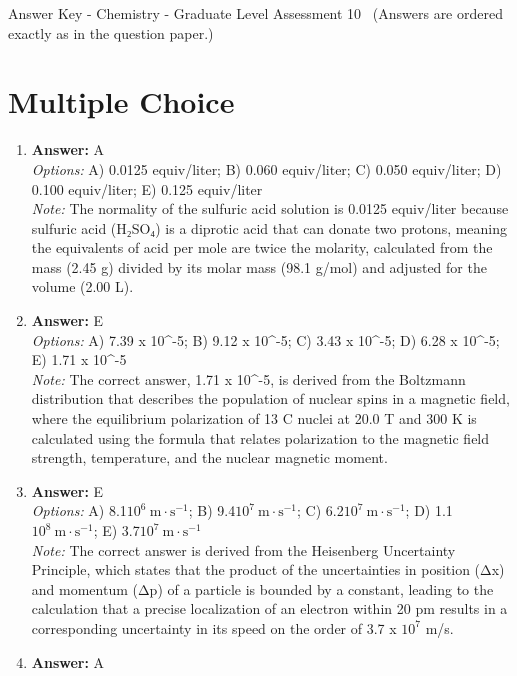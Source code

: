 \documentclass[12pt]{article}
\begin{document}
\begin{center}
Answer Key - Chemistry - Graduate Level Assessment 10 \
\small (Answers are ordered exactly as in the question paper.)
\end{center}

\section*{Multiple Choice}
\begin{enumerate}[label=\arabic*.]
\item \textbf{Answer:} A
\\ \textit{Options:} A) 0.0125 equiv/liter; B) 0.060 equiv/liter; C) 0.050 equiv/liter; D) 0.100 equiv/liter; E) 0.125 equiv/liter
\\ \textit{Note:} The normality of the sulfuric acid solution is 0.0125 equiv/liter because sulfuric acid (H₂SO₄) is a diprotic acid that can donate two protons, meaning the equivalents of acid per mole are twice the molarity, calculated from the mass (2.45 g) divided by its molar mass (98.1 g/mol) and adjusted for the volume (2.00 L).
\item \textbf{Answer:} E
\\ \textit{Options:} A) 7.39 x 10^-5; B) 9.12 x 10^-5; C) 3.43 x 10^-5; D) 6.28 x 10^-5; E) 1.71 x 10^-5
\\ \textit{Note:} The correct answer, 1.71 x 10^-5, is derived from the Boltzmann distribution that describes the population of nuclear spins in a magnetic field, where the equilibrium polarization of 13 C nuclei at 20.0 T and 300 K is calculated using the formula that relates polarization to the magnetic field strength, temperature, and the nuclear magnetic moment.
\item \textbf{Answer:} E
\\ \textit{Options:} A) 8.1$10^6 \mathrm{~m} \cdot \mathrm{s}^{-1}$; B) 9.4$10^7 \mathrm{~m} \cdot \mathrm{s}^{-1}$; C) 6.2$10^7 \mathrm{~m} \cdot \mathrm{s}^{-1}$; D) 1.1$10^8 \mathrm{~m} \cdot \mathrm{s}^{-1}$; E) 3.7$10^7 \mathrm{~m} \cdot \mathrm{s}^{-1}$
\\ \textit{Note:} The correct answer is derived from the Heisenberg Uncertainty Principle, which states that the product of the uncertainties in position (Δx) and momentum (Δp) of a particle is bounded by a constant, leading to the calculation that a precise localization of an electron within 20 pm results in a corresponding uncertainty in its speed on the order of 3.7 x $10^7$ m/s.
\item \textbf{Answer:} A

\end{enumerate}
\end{document}
